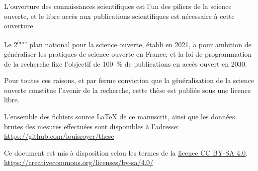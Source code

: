 \documentclass[../main.tex]{subfiles}
\begin{document}
\begin{licenseHeader}
L’ouverture des connaissances scientifiques est l’un des piliers de la science ouverte, et le libre accès aux publications scientifiques est nécessaire à cette ouverture.

Le 2\textsuperscript{ème} plan national pour la science ouverte, établi en 2021, a pour ambition de généraliser les pratiques de science ouverte en France, et la loi de programmation de la recherche fixe l’objectif de 100~\% de publications en accès ouvert en 2030.

\vspace{0.5cm}
\astersmall
\vspace{0.5cm}

Pour toutes ces raisons, et par ferme conviction que la généralisation de la science ouverte constitue l’avenir de la recherche, cette thèse est publiée sous une licence libre.
\end{licenseHeader}

\vspace{2cm}
\asterthree
\vspace{2cm}
L’ensemble des fichiers source \LaTeX{} de ce manuscrit, ainsi que les données brutes des mesures effectuées sont disponibles à l’adresse: \url{https://github.com/louisroyer/these}

\begin{licenseFooter}
\faCreativeCommons \hspace{0.1cm} \faCreativeCommonsBy \hspace{0.1cm} \faCreativeCommonsSa \hspace{0.5cm} Ce document est mis à disposition selon les termes de la \href{https://creativecommons.org/licenses/by-sa/4.0/deed.fr}{licence CC BY-SA 4.0}. \\
\url{https://creativecommons.org/licenses/by-sa/4.0/}
\end{licenseFooter}
\end{document}
